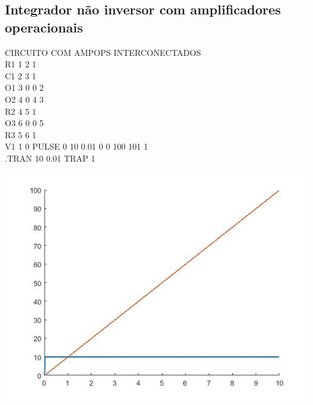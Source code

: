 \documentclass[12pt]{article}
\begin{document}
\subsection{Integrador não inversor com amplificadores operacionais}
  CIRCUITO COM  AMPOPS INTERCONECTADOS\\
  R1 1 2 1\\
  C1 2 3 1\\
  O1 3 0 0 2\\
  O2 4 0 4 3\\
  R2 4 5 1\\
  O3 6 0 0 5\\
  R3 5 6 1\\
  V1 1 0 PULSE 0 10 0.01 0 0 100 101 1\\
  .TRAN 10 0.01 TRAP 1\\
  \begin{center}
  \includegraphics[scale=0.75]{ampops}
  \end{center}
\end{document}
